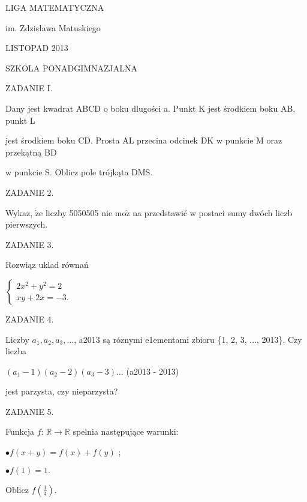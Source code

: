 \documentclass[a4paper,12pt]{article}
\begin{document}
LIGA MATEMATYCZNA

im. Zdzisława Matuskiego

LISTOPAD 2013

SZKOLA PONADGIMNAZJALNA

ZADANIE I.

Dany jest kwadrat ABCD o boku dlugości a. Punkt K jest środkiem boku AB, punkt L

jest środkiem boku CD. Prosta AL przecina odcinek DK w punkcie M oraz przekątną BD

w punkcie S. Oblicz pole trójkąta DMS.

ZADANIE 2.

Wykaz, $\dot{\mathrm{z}}\mathrm{e}$ liczby 5050505 nie $\mathrm{m}\mathrm{o}\dot{\mathrm{z}}$ na przedstawić w postaci sumy dwóch liczb pierwszych.

ZADANIE 3.

Rozwiąz uklad równań

$\left\{\begin{array}{l}
2x^{2}+y^{2}=2\\
xy+2x=-3.
\end{array}\right.$

ZADANIE 4.

Liczby $a_{1}, a_{2}, a_{3}, \ldots$, a2013 są róznymi e1ementami zbioru \{1, 2, 3, $\ldots$, 2013\}. Czy liczba

$(a_{1}-1)(a_{2}-2)(a_{3}-3)\ldots$ (a2013 - 2013)

jest parzysta, czy nieparzysta?

ZADANIE 5.

Funkcja $f$: $\mathbb{R}\rightarrow \mathbb{R}$ spelnia następujące warunki:

$\bullet f(x+y)=f(x)+f(y)$ ;

$\bullet f(1)=1.$

Oblicz $f(\displaystyle \frac{1}{4}).$
\end{document}
